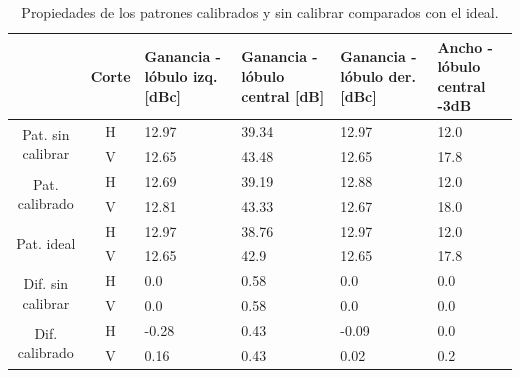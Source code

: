 \begin{table}[H]
  \footnotesize
  \centering
  \begin{tabular}{|c|c|p{2cm}|p{2.5cm}|p{2.5cm}|p{2.5cm}|}
    \cline{2-6}
    \multicolumn{1}{c|}{} & Corte & Ganancia - lóbulo izq. [dBc] & Ganancia - lóbulo central [dB] &
    Ganancia - lóbulo der. [dBc] & Ancho - lóbulo central -3dB \tabularnewline\hline
    \multirow{2}{2cm}{Pat. sin calibrar} & H & 12.97 & 39.34 & 12.97 & 12.0 \tabularnewline\cline{2-6}
     & V & 12.65 & 43.48 & 12.65 & 17.8 \tabularnewline\hline
    \multirow{2}{2cm}{Pat. calibrado} & H & 12.69 & 39.19 & 12.88 & 12.0 \tabularnewline\cline{2-6}
     & V & 12.81 & 43.33 & 12.67 & 18.0 \tabularnewline\hline
    \multirow{2}{2cm}{Pat. ideal} & H & 12.97 & 38.76 & 12.97 & 12.0 \tabularnewline\cline{2-6}
     & V & 12.65 & 42.9 & 12.65 & 17.8 \tabularnewline\hline
    \multirow{2}{2cm}{Dif. sin calibrar} & H & 0.0 & 0.58 & 0.0 & 0.0\tabularnewline\cline{2-6}
     & V & 0.0 & 0.58 & 0.0 & 0.0 \tabularnewline\hline
    \multirow{2}{2cm}{Dif. calibrado} & H & -0.28 & 0.43 & -0.09 & 0.0 \tabularnewline\cline{2-6}
     & V & 0.16 & 0.43 & 0.02 & 0.2 \tabularnewline\hline
  \end{tabular}
  \caption{Propiedades de los patrones calibrados y sin calibrar comparados con el ideal.}
  \label{tab:wallErrClassical10degRow}
\end{table}
